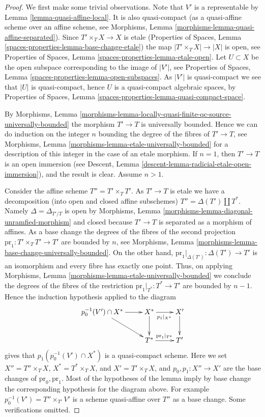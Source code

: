 \begin{proof}
We first make some trivial observations. 
Note that $V'$ is a representable by Lemma \ref{lemma-quasi-affine-local}.
It is also quasi-compact (as a quasi-affine scheme over an affine scheme, see
Morphisms, Lemma \ref{morphisms-lemma-quasi-affine-separated}).
Since $T' \times_T X \to X$ is etale
(Properties of Spaces, Lemma \ref{spaces-properties-lemma-base-change-etale})
the map $|T' \times_T X| \to |X|$ is open, see
Properties of Spaces, Lemma \ref{spaces-properties-lemma-etale-open}.
Let $U \subset X$ be the open subspace corresponding to the image of
$|V'|$, see
Properties of Spaces, Lemma \ref{spaces-properties-lemma-open-subspaces}.
As $|V'|$ is quasi-compact we see that $|U|$ is quasi-compact, hence
$U$ is a quasi-compact algebraic spaces, by 
Properties of Spaces, Lemma \ref{spaces-properties-lemma-quasi-compact-space}.

\medskip\noindent
By
Morphisms,
Lemma \ref{morphisms-lemma-locally-quasi-finite-qc-source-universally-bounded}
the morphism $T' \to T$ is universally bounded. Hence we can do induction on
the integer $n$ bounding the degree of the fibres of $T' \to T$, see
Morphisms, Lemma \ref{morphisms-lemma-etale-universally-bounded}
for a description of this integer in the case of an etale morphism.
If $n = 1$, then $T' \to T$ is an open immersion (see
Descent, Lemma \ref{descent-lemma-radicial-etale-open-immersion}),
and the result is clear. Assume $n > 1$.

\medskip\noindent
Consider the affine scheme $T'' = T' \times_T T'$.
As $T' \to T$ is etale we have a decomposition (into open and closed affine
subschemes) $T'' = \Delta(T') \amalg T^*$. Namely $\Delta = \Delta_{T'/T}$
is open by
Morphisms, Lemma \ref{morphisms-lemma-diagonal-unramfied-morphism}
and closed because $T' \to T$ is separated as a morphism of affines.
As a base change the degrees of the fibres of the second projection
$\text{pr}_1 : T' \times_T T' \to T'$ are bounded by $n$, see
Morphisms, Lemma \ref{morphisms-lemma-base-change-universally-bounded}.
On the other hand, $\text{pr}_1|_{\Delta(T')} : \Delta(T') \to T'$ is
an isomorphism and every fibre has exactly one point.
Thus, on applying
Morphisms, Lemma \ref{morphisms-lemma-etale-universally-bounded}
we conclude the degrees of the fibres of the restriction
$\text{pr}_1|_{T^*} : T^* \to T'$ are bounded by $n - 1$.
Hence the induction hypothesis applied to the diagram
$$
\xymatrix{
p_0^{-1}(V') \cap X^* \ar[r] \ar[rd] &
X^* \ar[r]_{p_1|_{X^*}} \ar[d] &
X' \ar[d] \\
& T^* \ar[r]^{\text{pr}_1|_{T^*}} & T'
}
$$
gives that $p_1(p_0^{-1}(V') \cap X^*)$
is a quasi-compact scheme. Here we set
$X'' = T'' \times_T X$, $X^* = T^* \times_T X$, and $X' = T' \times_T X$,
and $p_0, p_1 : X'' \to X'$ are the base changes of $\text{pr}_0, \text{pr}_1$.
Most of the hypotheses of the lemma imply
by base change the corresponding hypothesis for the diagram above.
For example $p_0^{-1}(V') = T'' \times_{T'} V'$
is a scheme quasi-affine over $T''$ as a base change. Some
verifications omitted.


\end{proof}
